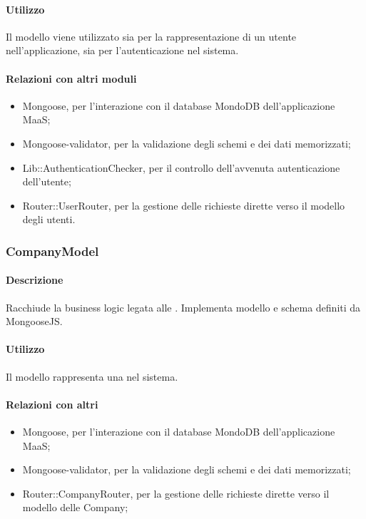 \paragraph*{Utilizzo}
Il modello viene utilizzato sia per la rappresentazione di un utente nell'applicazione, sia per l'autenticazione nel sistema.

\paragraph*{Relazioni con altri moduli}
\begin{itemize}
\item Mongoose, per l'interazione con il database MondoDB dell'applicazione MaaS;
\item Mongoose-validator, per la validazione degli schemi e dei dati memorizzati;
\item Lib::AuthenticationChecker, per il controllo dell'avvenuta autenticazione dell'utente;
\item Router::UserRouter, per la gestione delle richieste dirette verso il modello degli utenti.
\end{itemize}

\subsubsection{CompanyModel}
\paragraph*{Descrizione}
Racchiude la business logic legata alle . Implementa modello e schema definiti da MongooseJS.

\paragraph*{Utilizzo}
Il modello rappresenta una  nel sistema.

\paragraph*{Relazioni con altri }
\begin{itemize}
\item Mongoose, per l'interazione con il database MondoDB dell'applicazione MaaS;
\item Mongoose-validator, per la validazione degli schemi e dei dati memorizzati;
\item Router::CompanyRouter, per la gestione delle richieste dirette verso il modello delle Company;
\end{itemize}

